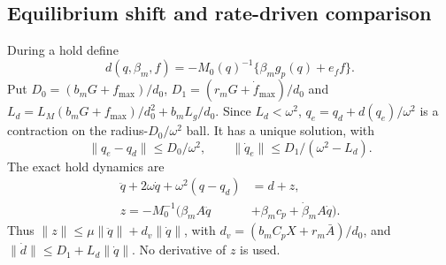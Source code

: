 \subsection{Equilibrium shift and rate-driven comparison}
During a hold define
\begin{equation}
 d(q,\beta_m,f)=-M_0(q)^{-1}\{\beta_m g_p(q)+e_f f\}.
\end{equation}
Put $D_0=(b_mG+f_{\max})/d_0$, $D_1=(r_mG+\dot f_{\max})/d_0$ and
$L_d=L_M(b_mG+f_{\max})/d_0^2+b_mL_g/d_0$. Since $L_d<\omega^2$, $q_e=q_d+d(q_e)/\omega^2$ is a contraction on the radius-$D_0/\omega^2$ ball. It has a unique solution, with
\begin{equation}
 \|q_e-q_d\|\le D_0/\omega^2,\qquad
 \|\dot q_e\|\le D_1/(\omega^2-L_d).
\end{equation}
The exact hold dynamics are
\begin{align}
 \ddot q+2\omega\dot q+\omega^2(q-q_d)&=d+z,\nonumber\\
 z=-M_0^{-1}(\beta_m A\ddot q&+\beta_m c_p+\dot\beta_m A\dot q).
\end{align}
Thus $\|z\|\le\mu\|\ddot q\|+d_v\|\dot q\|$, with
$d_v=(b_mC_pX+r_m\bar A)/d_0$, and
$\|\dot d\|\le D_1+L_d\|\dot q\|$. No derivative of $z$ is used.

